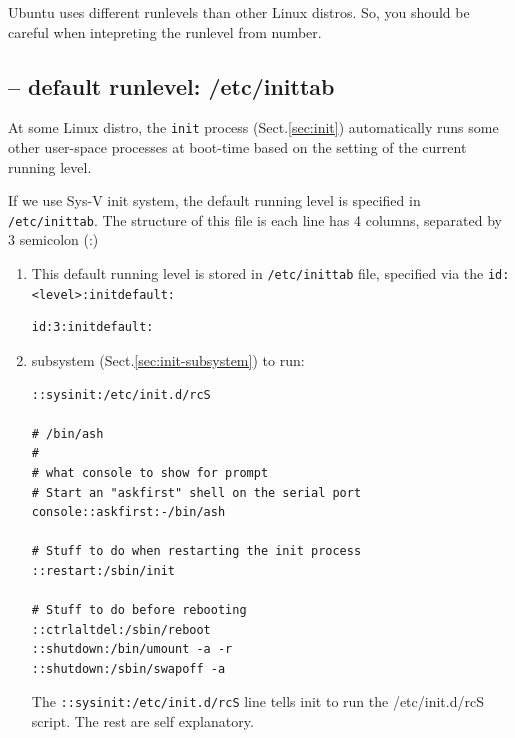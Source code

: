 Ubuntu uses different runlevels than other Linux distros. 
So, you should be careful when intepreting the runlevel from number.

\subsection{-- default runlevel: /etc/inittab}
\label{sec:inittab}

At some Linux distro, the \verb!init! process (Sect.\ref{sec:init})
automatically runs some other user-space processes at boot-time
based on the setting of the current running level.

If we use Sys-V init system, the default running level is specified in
\verb!/etc/inittab!. The structure of this file is each line has 4 columns,
separated by 3 semicolon (:)

\begin{enumerate}
  \item  
This default running level is stored in \verb!/etc/inittab! file, specified via
the \verb!id:<level>:initdefault:!

\begin{verbatim}
id:3:initdefault:
\end{verbatim}
  
   \item subsystem (Sect.\ref{sec:init-subsystem}) to run: 
   

\begin{verbatim}
::sysinit:/etc/init.d/rcS 

# /bin/ash
#
# what console to show for prompt
# Start an "askfirst" shell on the serial port
console::askfirst:-/bin/ash

# Stuff to do when restarting the init process
::restart:/sbin/init

# Stuff to do before rebooting
::ctrlaltdel:/sbin/reboot
::shutdown:/bin/umount -a -r
::shutdown:/sbin/swapoff -a
\end{verbatim}

The \verb!::sysinit:/etc/init.d/rcS! line tells init to run the /etc/init.d/rcS
script. The rest are self explanatory. 


\end{enumerate}

% 

